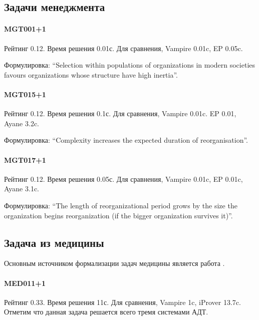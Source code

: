 \subsection{Задачи менеджмента}

\paragraph{MGT001+1}
Рейтинг 0.12. Время решения 0.01с. Для сравнения, Vampire 0.01c, EP 0.05c.

Формулировка: ``Selection within populations of organizations in modern societies favours organizations whose structure have high inertia''.

\paragraph{MGT015+1}
Рейтинг 0.12. Время решения 0.1с. Для сравнения, Vampire 0.01c. EP 0.01, Ayane 3.2c.

Формулировка: ``Complexity increases the expected duration of reorganisation''.

\paragraph{MGT017+1}
Рейтинг 0.12. Время решения 0.05с. Для сравнения, Vampire 0.01c, EP 0.01c, Ayane 3.1c.

 Формулировка: ``The length of reorganizational period grows by the size the organization begins reorganization (if the bigger organization survives it)''.



\subsection{Задача из медицины}
Основным источником формализации задач медицины является работа \cite{med1}.

\paragraph{MED011+1}
Рейтинг 0.33. Время решения 11с. Для сравнения, Vampire 1c, iProver 13.7c. Отметим что данная задача решается всего тремя системами АДТ.

